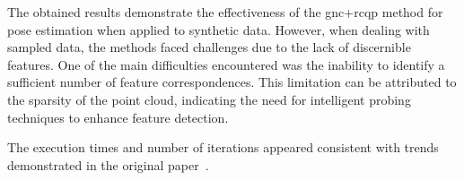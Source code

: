 The obtained results demonstrate the effectiveness of the \gls{gnc}+\gls{rcqp} method for pose estimation when applied to synthetic data. However, when dealing with sampled data, the methods faced challenges due to the lack of discernible features. One of the main difficulties encountered was the inability to identify a sufficient number of feature correspondences. This limitation can be attributed to the sparsity of the point cloud, indicating the need for intelligent probing techniques to enhance feature detection. \medskip

The execution times and number of iterations appeared consistent with trends demonstrated in the original paper~\cite{graduated-non-convexity-for-robust-spatial-perception:-from-non-minimal-solvers-to-global-outlier-rejection}. \medskip


